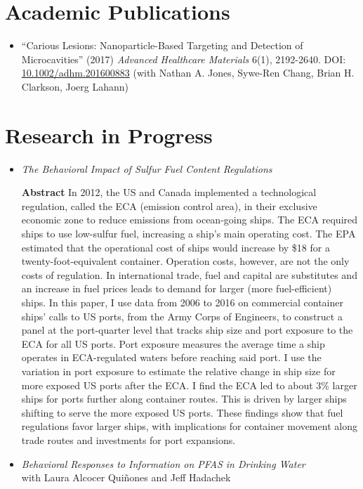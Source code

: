 \documentclass{article}[12]
\begin{document}
\section{Academic Publications}

\begin{itemize}
    \item ``Carious Lesions: Nanoparticle-Based Targeting and Detection of Microcavities'' (2017) \emph{Advanced Healthcare Materials} 6(1), 2192-2640. DOI: \url{ 10.1002/adhm.201600883} (with Nathan A. Jones, Sywe-Ren Chang, Brian H. Clarkson, Joerg Lahann)
\end{itemize}

\section{Research in Progress}
\begin{itemize}
    \item \textit{The Behavioral Impact of Sulfur Fuel Content Regulations}

\textbf{Abstract} In 2012, the US and Canada implemented a technological regulation, called the ECA (emission control area), in their exclusive economic zone to reduce emissions from ocean-going ships. The ECA required ships to use low-sulfur fuel, increasing a ship’s main operating cost. The EPA estimated that the operational cost of ships would increase by \$18 for a twenty-foot-equivalent container. Operation costs, however, are not the only costs of regulation. In international trade, fuel and capital are substitutes and an increase in fuel prices leads to demand for larger (more fuel-efficient) ships. In this paper, I use data from 2006 to 2016 on commercial container ships’ calls to US ports, from the Army Corps of Engineers, to construct a panel at the port-quarter level that tracks ship size and port exposure to the ECA for all US ports. Port exposure measures the average time a ship operates in ECA-regulated waters before reaching said port. I use the variation in port exposure to estimate the relative change in ship size for more exposed US ports after the ECA. I find the ECA led to about 3\% larger ships for ports further along container routes. This is driven by larger ships shifting to serve the more exposed US ports. These findings show that fuel regulations favor larger ships, with implications for container movement along trade routes and investments for port expansions.  
    \item \textit{Behavioral Responses to Information on PFAS in Drinking Water} \\ with Laura Alcocer Qui\~nones and Jeff Hadachek    
\end{itemize}
\end{document}

